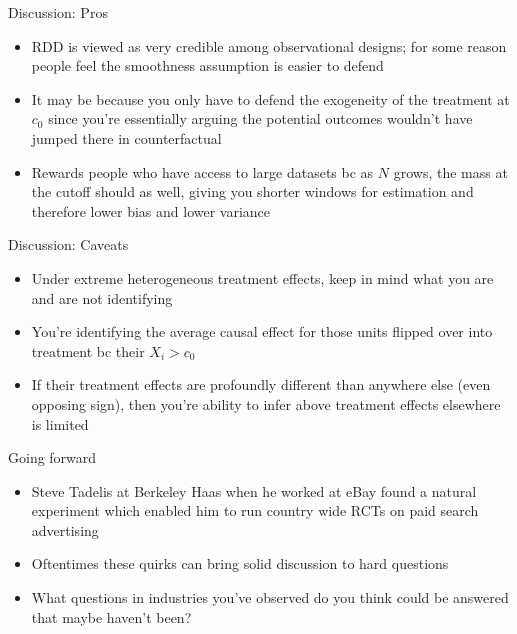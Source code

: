 \documentclass{beamer}
\begin{document}
\begin{frame}{Discussion: Pros}

\begin{itemize}
\item RDD is viewed as very credible among observational designs; for some reason people feel the smoothness assumption is easier to defend
\item It may be because you only have to defend the exogeneity of the treatment at $c_0$ since you're essentially arguing the potential outcomes wouldn't have jumped there in counterfactual
\item Rewards people who have access to large datasets bc as $N$ grows, the mass at the cutoff should as well, giving you shorter windows for estimation and therefore lower bias and lower variance
\end{itemize}

\end{frame}

\begin{frame}{Discussion: Caveats}

\begin{itemize}
\item Under extreme heterogeneous treatment effects, keep in mind what you are and are not identifying
\item You're identifying the average causal effect for those units flipped over into treatment bc their $X_i>c_0$
\item If their treatment effects are profoundly different than anywhere else (even opposing sign), then you're ability to infer above treatment effects elsewhere is limited
\end{itemize}

\end{frame}

\begin{frame}{Going forward}

\begin{itemize}
\item Steve Tadelis at Berkeley Haas when he worked at eBay found a natural experiment which enabled him to run country wide RCTs on paid search advertising
\item Oftentimes these quirks can bring solid discussion to hard questions
\item What questions in industries you've observed do you think could be answered that maybe haven't been?
\end{itemize}

\end{frame}
\end{document}
